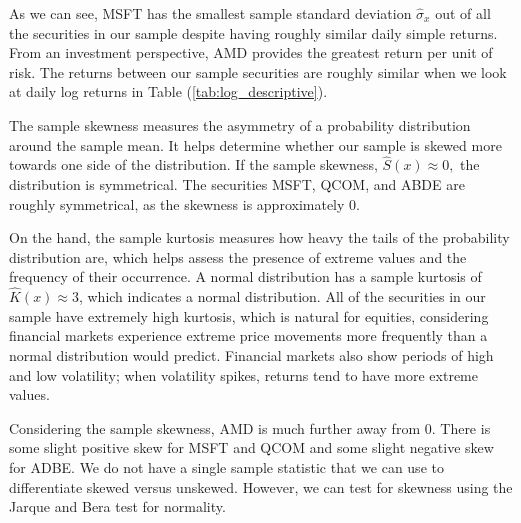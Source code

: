 \documentclass[12pt]{article}
\begin{document}
As we can see, MSFT has the smallest sample standard deviation $\hat{\sigma}_x$ out of all the securities in our sample despite having roughly similar daily simple returns. From an investment perspective, AMD provides the greatest return per unit of risk. The returns between our sample securities are roughly similar when we look at daily log returns in Table (\ref{tab:log_descriptive}).

The sample skewness measures the asymmetry of a probability distribution around the sample mean. It helps determine whether our sample is skewed more towards one side of the distribution. If the sample skewness, $\hat{S}(x)\approx 0,$ the distribution is symmetrical. The securities MSFT, QCOM, and ABDE are roughly symmetrical, as the skewness is approximately 0. 

On the hand, the sample kurtosis measures how heavy the tails of the probability distribution are, which helps assess the presence of extreme values and the frequency of their occurrence. A normal distribution has a sample kurtosis of  $\hat{K}(x)\approx 3$, which indicates a normal distribution. All of the securities in our sample have extremely high kurtosis, which is natural for equities, considering financial markets experience extreme price movements more frequently than a normal distribution would predict. Financial markets also show periods of high and low volatility; when volatility spikes, returns tend to have more extreme values.

Considering the sample skewness, AMD is much further away from 0. There is some slight positive skew for MSFT and QCOM and some slight negative skew for ADBE. We do not have a single sample statistic that we can use to differentiate skewed versus unskewed. However, we can test for skewness using the Jarque and Bera test for normality.
\end{document}
